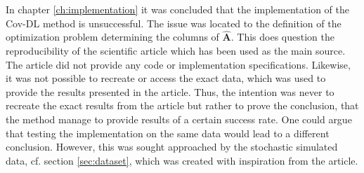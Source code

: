 In chapter \ref{ch:implementation} it was concluded that the implementation of the Cov-DL method is unsuccessful.
The issue was located to the definition of the optimization problem determining the columns of $\hat{\mathbf{A}}$. 
This does question the reproducibility of the scientific article \cite{Balkan2015} which has been used as the main source. 
The article \cite{Balkan2015} did not provide any code or implementation specifications. 
Likewise, it was not possible to recreate or access the exact data, which was used to provide the results presented in the article. 
Thus, the intention was never to recreate the exact results from the article but rather to prove the conclusion, that the method manage to provide results of a certain success rate. 
One could argue that testing the implementation on the same data would lead to a different conclusion. 
However, this was sought approached by the stochastic simulated data, cf. section \ref{sec:dataset}, which was created with inspiration from the article.

